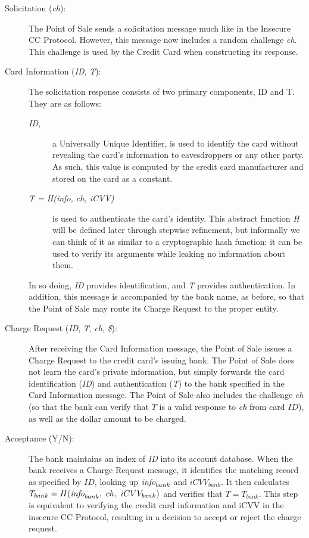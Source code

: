 \begin{description}
\item[Solicitation (\emph{ch}):]
The Point of Sale sends a solicitation message much like in the Insecure CC Protocol.
However, this message now includes a random challenge \emph{ch}.
This challenge is used by the Credit Card when constructing its response.

\item[Card Information (\emph{ID}, \emph{T}):]
The solicitation response consists of two primary components, ID and T. They are as follows:

\begin{description}
\item[\emph{ID},]a Universally Unique Identifier\cite{uuid}, is used to identify the card without revealing the card's information to eavesdroppers or any other party.
As such, this value is computed by the credit card manufacturer and stored on the card as a constant.

\item[\emph{T = H(info, ch, iCVV)}] is used to authenticate the card's identity.
This abstract function \emph{H} will be defined later through stepwise refinement, but informally we can think of it as similar to a cryptographic hash function:
	it can be used to verify its arguments while leaking no information about them.
\end{description}

In so doing, \emph{ID} provides identification, and \emph{T} provides authentication.
In addition, this message is accompanied by the bank name, as before, so that the Point of Sale may route its Charge Request to the proper entity.

\item[Charge Request (\emph{ID}, \emph{T}, \emph{ch}, \emph{\$}):]
After receiving the Card Information message, the Point of Sale issues a Charge Request to the credit card's issuing bank.
The Point of Sale does not learn the card's private information, but simply forwards the card identification (\emph{ID}) and authentication (\emph{T}) to the bank specified in the Card Information message.
The Point of Sale also includes the challenge \emph{ch}
	(so that the bank can verify that $T$ is a valid response to \emph{ch} from card $ID$),
	as well as the dollar amount to be charged.

\item[Acceptance (Y/N):]
The bank maintains an index of \emph{ID} into its account database.
When the bank receives a Charge Request message, it identifies the matching record as specified by $ID$, looking up $\textrm{\emph{info}}_{bank}$ and $iCVV_{bank}$.
It then calculates $T_{bank} = H(\textrm{\emph{info}}_{bank},~ ch,~ iCVV_{bank})$ and verifies that $T = T_{bank}$.
This step is equivalent to verifying the credit card information and iCVV in the insecure CC Protocol,
	resulting in a decision to accept or reject the charge request.

\end{description}





